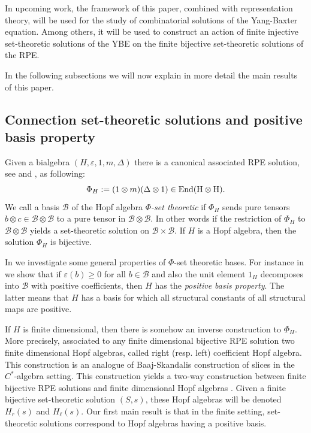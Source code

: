 \documentclass[a4paper,10pt]{amsart}
\theoremstyle{definition}
\theoremstyle{remark}
\newcommand\End{\rm End}
\newcommand\D{\Delta}
\newcommand\eps{\varepsilon}
\newcommand\ot{\otimes}
\newcommand\mc{\mathcal}
\begin{document}
In upcoming work, the framework of this paper, combined with representation theory, will be used for the study of combinatorial solutions of the Yang-Baxter equation. Among others, it will be used to construct an action of finite injective set-theoretic solutions of the YBE on the finite bijective set-theoretic solutions of the RPE.\

In the following subsections we will now explain in more detail the main results of this paper.

\subsection{Connection set-theoretic solutions and positive basis property}\label{subsec:connection}
Given a bialgebra $(H, \eps, 1, m, \D)$ there is a canonical associated RPE solution, see \cite{Dav} and , as following:
\begin{equation}\label{phi constr intro}
\Phi_H := (1 \ot m)(\D \ot 1) \in \End(H \ot H).
\end{equation}
We call a basis $\mc{B}$ of the Hopf algebra \emph{$\Phi$-set theoretic} if $\Phi_H$ sends pure tensors $b \ot c \in \mc{B} \ot \mc{B}$ to a pure tensor in $\mc{B} \ot \mc{B}$. In other words if the restriction of $\Phi_H$ to $\mc{B} \ot \mc{B}$ yields a set-theoretic solution on $\mc{B} \times \mc{B}.$ If $H$ is a Hopf algebra, then the solution $\Phi_H$ is bijective.\smallskip

In  we investigate some general properties of $\Phi$-set theoretic bases. For instance in  we show that if $\eps(b) \geq 0$ for all $b \in \mc{B}$ and also the unit element $1_H$ decomposes into $\mc{B}$ with positive coefficients, then $H$ has the \emph{positive basis property}. The latter means that $H$ has a basis for which all structural constants of all structural maps are positive.\smallskip 

If $H$ is finite dimensional, then there is somehow an inverse construction to $\Phi_H$. More precisely, \cite{Dav, Mi04} associated to any finite dimensional bijective RPE solution two finite dimensional Hopf algebras, called right (resp. left) coefficient Hopf algebra. This construction is an analogue of Baaj-Skandalis construction \cite{BaSk93} of slices in the $C^*$-algebra setting. This construction yields a two-way construction between finite bijective RPE solutions and finite dimensional Hopf algebras \cite[Theorem 3.1]{Mi04}. Given a finite bijective set-theoretic solution $(S,s)$, these Hopf algebras will be denoted $H_{r}(s)$ and $H_{\ell}(s)$. Our first main result is that in the finite setting, set-theoretic solutions correspond to Hopf algebras having a positive basis.
\end{document}
